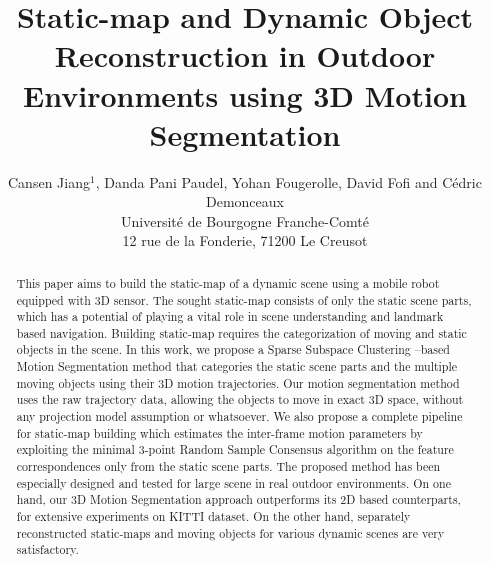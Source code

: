 \documentclass[10pt,twocolumn,letterpaper]{article}  %
\title{\LARGE \bf
Static-map and Dynamic Object Reconstruction in Outdoor Environments using 3D Motion Segmentation }
\author{Cansen Jiang$^{1}$, Danda Pani Paudel, Yohan Fougerolle, David Fofi and C\'edric Demonceaux \\
Universit\'e de Bourgogne Franche-Comt\'e\\
12 rue de la Fonderie, 71200 Le Creusot\\} %
\begin{document}
\maketitle
\thispagestyle{empty}
\pagestyle{empty}


\begin{abstract}
This paper aims to build the static-map of a dynamic scene using a mobile robot equipped with 3D sensor. The sought static-map consists of only the static scene parts, which has a potential of playing a vital role in scene understanding and landmark based navigation. Building static-map requires the categorization of moving and static objects in the scene.  In this work, we propose a Sparse Subspace Clustering –based Motion Segmentation method that categories the static scene parts and the multiple moving objects using their 3D motion trajectories.  Our motion segmentation method uses the raw trajectory data, allowing the objects to move in exact 3D space, without any projection model assumption or whatsoever. We also propose a complete pipeline for static-map building which estimates the inter-frame motion parameters by exploiting the minimal 3-point Random Sample Consensus algorithm on the feature correspondences only from the static scene parts.  The proposed method has been especially designed and tested for large scene in real outdoor environments. On one hand, our 3D Motion Segmentation approach outperforms its 2D based counterparts, for extensive experiments on KITTI dataset. On the other hand, separately reconstructed static-maps and moving objects for various dynamic scenes are very satisfactory.

\end{abstract}


\end{document}
